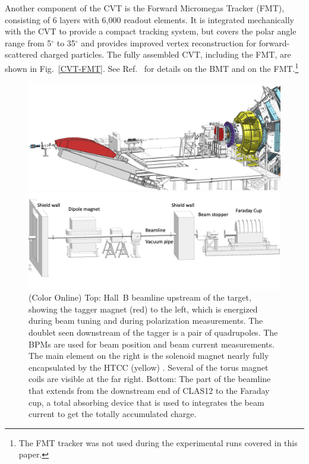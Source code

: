 \documentclass[final,3p,twocolumn]{elsarticle}
\begin{document}
Another component of the CVT is the Forward Micromegas Tracker (FMT), consisting of 6 layers with 6,000 readout
elements. It  is integrated mechanically with the CVT to provide a compact tracking system, but covers the polar
angle range from 5$^\circ$ to 35$^\circ$ and provides improved vertex reconstruction for forward-scattered
charged particles. The fully assembled CVT, including the FMT, are shown in Fig.~\ref{CVT-FMT}.  See
Ref.~\cite{BMT} for details on the BMT and on the FMT.\footnote{The FMT tracker was not used
 during the experimental runs covered in this paper.}  



\begin{figure}[t!]
\centerline{\includegraphics[width=2.0\columnwidth]{beamline-1.png}}
\centerline{\includegraphics[width=1.3\columnwidth]{beamline-3.png}}
\caption{(Color Online) Top: Hall~B beamline upstream of the target, showing the tagger magnet (red) to the left, which is energized
  during beam tuning and during polarization measurements. The doublet seen downstream of the tagger is a pair
  of quadrupoles. The BPMs are used for beam position and beam current measurements. The
  main element on the right is the solenoid magnet nearly fully encapsulated by the HTCC (yellow) . Several of the torus
  magnet coils are visible at the far right. Bottom: The part of the beamline that extends from the downstream end of CLAS12 
  to the Faraday cup, a total absorbing device that is used to integrates the beam current to get the totally accumulated charge.}
\label{beamline}
\end{figure}
\end{document}
